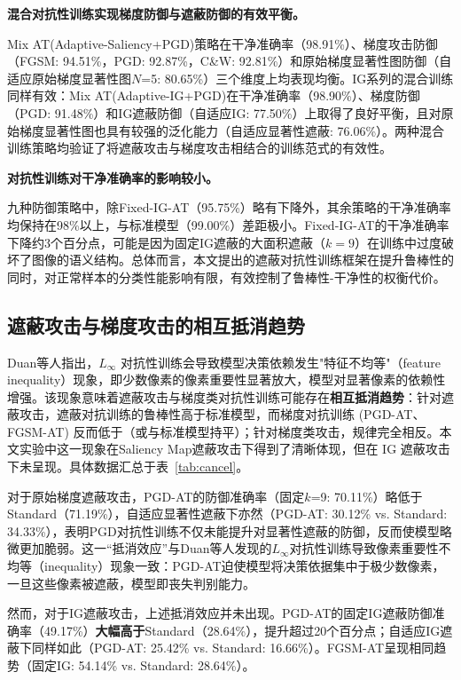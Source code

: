 \textbf{混合对抗性训练实现梯度防御与遮蔽防御的有效平衡。}

Mix AT(Adaptive-Saliency+PGD)策略在干净准确率（98.91\%）、梯度攻击防御（FGSM: 94.51\%，PGD: 92.87\%，C\&W: 92.81\%）和原始梯度显著性图防御（自适应原始梯度显著性图$N$=5: 80.65\%）三个维度上均表现均衡。IG系列的混合训练同样有效：Mix AT(Adaptive-IG+PGD)在干净准确率（98.90\%）、梯度防御（PGD: 91.48\%）和IG遮蔽防御（自适应IG: 77.50\%）上取得了良好平衡，且对原始梯度显著性图也具有较强的泛化能力（自适应显著性遮蔽: 76.06\%）。两种混合训练策略均验证了将遮蔽攻击与梯度攻击相结合的训练范式的有效性。

\textbf{对抗性训练对干净准确率的影响较小。}

九种防御策略中，除Fixed-IG-AT（95.75\%）略有下降外，其余策略的干净准确率均保持在98\%以上，与标准模型（99.00\%）差距极小。Fixed-IG-AT的干净准确率下降约3个百分点，可能是因为固定IG遮蔽的大面积遮蔽（$k=9$）在训练中过度破坏了图像的语义结构。总体而言，本文提出的遮蔽对抗性训练框架在提升鲁棒性的同时，对正常样本的分类性能影响有限，有效控制了鲁棒性-干净性的权衡代价。





\subsection{遮蔽攻击与梯度攻击的相互抵消趋势} \label{sec:cancellation}

Duan等人\cite{Duan2023InequalityPI}指出，$L_\infty$ 对抗性训练会导致模型决策依赖发生"特征不均等"（feature inequality）现象，即少数像素的像素重要性显著放大，模型对显著像素的依赖性增强。该现象意味着遮蔽攻击与梯度类对抗性训练可能存在\textbf{相互抵消趋势}：针对遮蔽攻击，遮蔽对抗训练的鲁棒性高于标准模型，而梯度对抗训练 (PGD-AT、FGSM-AT) 反而低于（或与标准模型持平）；针对梯度类攻击，规律完全相反。本文实验中这一现象在Saliency Map遮蔽攻击下得到了清晰体现，但在 IG 遮蔽攻击下未呈现。具体数据汇总于表~\ref{tab:cancel}。



对于原始梯度遮蔽攻击，PGD-AT的防御准确率（固定$k$=9: 70.11\%）略低于Standard（71.19\%），自适应显著性遮蔽下亦然（PGD-AT: 30.12\% vs. Standard: 34.33\%），表明PGD对抗性训练不仅未能提升对显著性遮蔽的防御，反而使模型略微更加脆弱。这一“抵消效应”与Duan等人\cite{Duan2023InequalityPI}发现的$L_\infty$对抗性训练导致像素重要性不均等（inequality）现象一致：PGD-AT迫使模型将决策依据集中于极少数像素，一旦这些像素被遮蔽，模型即丧失判别能力。

然而，对于IG遮蔽攻击，上述抵消效应并未出现。PGD-AT的固定IG遮蔽防御准确率（49.17\%）\textbf{大幅高于}Standard（28.64\%），提升超过20个百分点；自适应IG遮蔽下同样如此（PGD-AT: 25.42\% vs. Standard: 16.66\%）。FGSM-AT呈现相同趋势（固定IG: 54.14\% vs. Standard: 28.64\%）。

